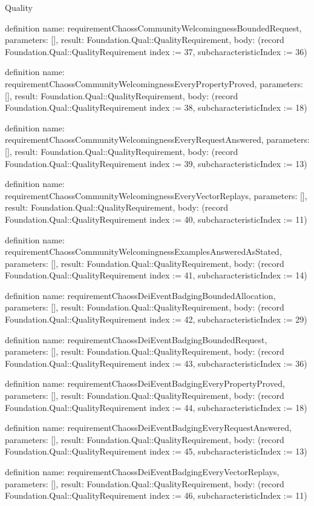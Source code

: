 \begin{lexlean}{Quality}
\begin{semanticmodule}
definition{
  name: requirementChaossCommunityWelcomingnessBoundedRequest,
  parameters: [],
  result: Foundation.Qual::QualityRequirement,
  body: (record Foundation.Qual::QualityRequirement {index := 37, subcharacteristicIndex := 36})
}

definition{
  name: requirementChaossCommunityWelcomingnessEveryPropertyProved,
  parameters: [],
  result: Foundation.Qual::QualityRequirement,
  body: (record Foundation.Qual::QualityRequirement {index := 38, subcharacteristicIndex := 18})
}

definition{
  name: requirementChaossCommunityWelcomingnessEveryRequestAnswered,
  parameters: [],
  result: Foundation.Qual::QualityRequirement,
  body: (record Foundation.Qual::QualityRequirement {index := 39, subcharacteristicIndex := 13})
}

definition{
  name: requirementChaossCommunityWelcomingnessEveryVectorReplays,
  parameters: [],
  result: Foundation.Qual::QualityRequirement,
  body: (record Foundation.Qual::QualityRequirement {index := 40, subcharacteristicIndex := 11})
}

definition{
  name: requirementChaossCommunityWelcomingnessExamplesAnsweredAsStated,
  parameters: [],
  result: Foundation.Qual::QualityRequirement,
  body: (record Foundation.Qual::QualityRequirement {index := 41, subcharacteristicIndex := 14})
}

definition{
  name: requirementChaossDeiEventBadgingBoundedAllocation,
  parameters: [],
  result: Foundation.Qual::QualityRequirement,
  body: (record Foundation.Qual::QualityRequirement {index := 42, subcharacteristicIndex := 29})
}

definition{
  name: requirementChaossDeiEventBadgingBoundedRequest,
  parameters: [],
  result: Foundation.Qual::QualityRequirement,
  body: (record Foundation.Qual::QualityRequirement {index := 43, subcharacteristicIndex := 36})
}

definition{
  name: requirementChaossDeiEventBadgingEveryPropertyProved,
  parameters: [],
  result: Foundation.Qual::QualityRequirement,
  body: (record Foundation.Qual::QualityRequirement {index := 44, subcharacteristicIndex := 18})
}

definition{
  name: requirementChaossDeiEventBadgingEveryRequestAnswered,
  parameters: [],
  result: Foundation.Qual::QualityRequirement,
  body: (record Foundation.Qual::QualityRequirement {index := 45, subcharacteristicIndex := 13})
}

definition{
  name: requirementChaossDeiEventBadgingEveryVectorReplays,
  parameters: [],
  result: Foundation.Qual::QualityRequirement,
  body: (record Foundation.Qual::QualityRequirement {index := 46, subcharacteristicIndex := 11})
}


\end{semanticmodule}
\end{lexlean}
